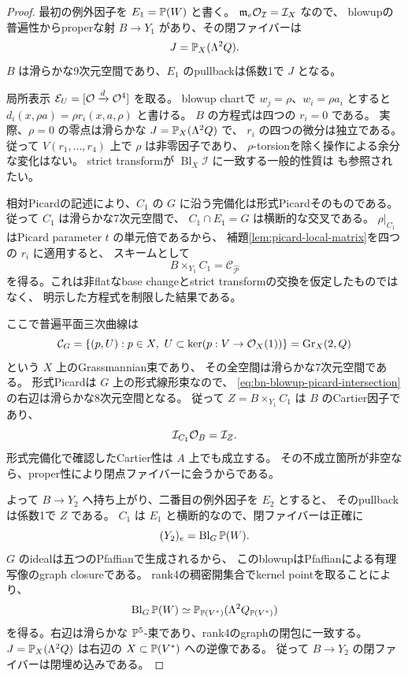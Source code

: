 \begin{proof}
最初の例外因子を $E_1=\mathbb P(W)$ と書く。
$\mathfrak m_e\mathcal O_{\mathcal I}=\mathcal I_X$ なので、
blowupの普遍性からproperな射 $B\to Y_1$ があり、その閉ファイバーは
\[
 J=\mathbb P_X(\Lambda^2Q).
\]
$B$ は滑らかな9次元空間であり、$E_1$ のpullbackは係数1で $J$ となる。

局所表示 $\mathcal E_U=[\mathcal O\xrightarrow{d}\mathcal O^4]$ を取る。
blowup chartで $w_j=\rho$、$w_i=\rho a_i$ とすると
$d_i(x,\rho a)=\rho r_i(x,a,\rho)$ と書ける。
$B$ の方程式は四つの $r_i=0$ である。
実際、$\rho=0$ の零点は滑らかな $J=\mathbb P_X(\Lambda^2Q)$ で、
$r_i$ の四つの微分は独立である。
従って $V(r_1,\ldots,r_4)$ 上で $\rho$ は非零因子であり、
$\rho$-torsionを除く操作による余分な変化はない。
strict transformが $\operatorname{Bl}_X\mathcal I$ に一致する一般的性質は
\cite{StacksStrictTransform}も参照されたい。

相対Picardの記述により、$C_1$ の $G$ に沿う完備化は形式Picardそのものである。
従って $C_1$ は滑らかな7次元空間で、
$C_1\cap E_1=G$ は横断的な交叉である。
$\rho|_{C_1}$ はPicard parameter $t$ の単元倍であるから、
補題\ref{lem:picard-local-matrix}を四つの $r_i$ に適用すると、
スキームとして
\begin{equation}\label{eq:bn-blowup-picard-intersection}
 B\times_{Y_1}C_1=\mathscr C_{\widehat{\mathcal P}}
\end{equation}
を得る。これは非flatなbase changeとstrict transformの交換を仮定したものではなく、
明示した方程式を制限した結果である。

ここで普遍平面三次曲線は
\[
 \mathcal C_G=\{(p,U):p\in X,\ U\subset\ker(p:V\to\mathcal O_X(1))\}
            =\operatorname{Gr}_X(2,Q)
\]
という $X$ 上のGrassmannian束であり、
その全空間は滑らかな7次元空間である。
形式Picardは $G$ 上の形式線形束なので、
\eqref{eq:bn-blowup-picard-intersection}の右辺は滑らかな8次元空間となる。
従って $Z=B\times_{Y_1}C_1$ は $B$ のCartier因子であり、
\[
 \mathcal I_{C_1}\mathcal O_B=\mathcal I_Z.
\]
形式完備化で確認したCartier性は $A$ 上でも成立する。
その不成立箇所が非空なら、proper性により閉点ファイバーに会うからである。

よって $B\to Y_2$ へ持ち上がり、二番目の例外因子を $E_2$ とすると、
そのpullbackは係数1で $Z$ である。
$C_1$ は $E_1$ と横断的なので、閉ファイバーは正確に
\[
 (Y_2)_e=\operatorname{Bl}_G\mathbb P(W).
\]
$G$ のidealは五つのPfaffianで生成されるから、
このblowupはPfaffianによる有理写像のgraph closureである。
rank4の稠密開集合でkernel pointを取ることにより、
\begin{equation}\label{eq:pfaffian-projective-graph}
 \operatorname{Bl}_G\mathbb P(W)
 \simeq\mathbb P_{\mathbb P(V^*)}(\Lambda^2Q_{\mathbb P(V^*)})
\end{equation}
を得る。右辺は滑らかな $\mathbb P^5$-束であり、rank4のgraphの閉包に一致する。
$J=\mathbb P_X(\Lambda^2Q)$ は右辺の $X\subset\mathbb P(V^*)$ への逆像である。
従って $B\to Y_2$ の閉ファイバーは閉埋め込みである。


\end{proof}
